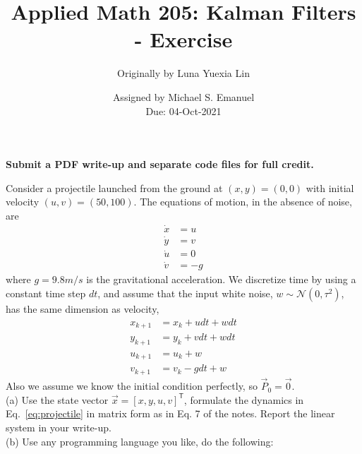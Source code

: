 \documentclass{article}
\title{Applied Math 205: Kalman Filters - Exercise}
\author{Originally by Luna Yuexia Lin}
\date{Assigned by Michael S. Emanuel\\
Due: 04-Oct-2021}
\newcommand{\vx}{\vec{x}}
\newcommand{\vP}{\vec{P}}
\begin{document}
\maketitle

\textbf{Submit a PDF write-up and separate code files for full credit.}

Consider a projectile launched from the ground at $(x, y) = (0, 0)$ with initial velocity $(u, v) = (50, 100)$.
The equations of motion, in the absence of noise, are
\begin{equation}
\begin{aligned}
\label{eq:dynamics}
\dot x &= u \\
\dot y &= v \\
\dot u & = 0 \\
\dot v & = -g
\end{aligned}
\end{equation}
where $g = 9.8 m/s$ is the gravitational acceleration.
We discretize time by using a constant time step $dt$, and assume that the input white noise, $w\sim \mathcal{N} (0, \tau^2)$, has the same dimension as velocity,
\begin{equation}
\begin{aligned}
\label{eq:projectile}
x_{k+1} &= x_k + u dt + w dt \\
y_{k+1} &= y_k + v dt + w dt \\
u_{k+1} & = u_{k} + w \\
v_{k+1} & = v_{k} - g dt + w
\end{aligned}
\end{equation}
Also we assume we know the initial condition perfectly, so $\vP_0 = \vec{0}$. 
\\
\noindent (a) Use the state vector $\vx = [x, y, u, v]^\mathsf{T}$, 
formulate the dynamics in Eq.~\ref{eq:projectile} in matrix form as in Eq. 7 of the notes. 
Report the linear system in your write-up. \\
\noindent (b) Use any programming language you like, do the following:
\end{document}
